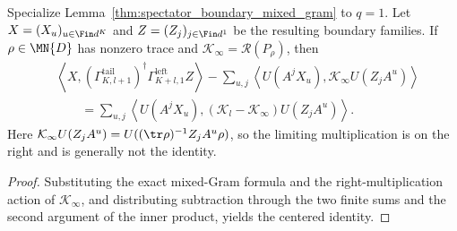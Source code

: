 \begin{lemma}%
    \label{thm:spectator_boundary_mixed_gram_centered}
    \leanok
    Specialize Lemma~\ref{thm:spectator_boundary_mixed_gram} to $q=1$.  Let
    $X=(X_u)_{u\in\Fin d^K}$ and
    $Z=(Z_j)_{j\in\Fin d^1}$ be the resulting boundary families.  If
    $\rho\in\MN{D}$ has nonzero trace and
    $\mathcal K_\infty=\mathscr R(P_\rho)$, then
    \begin{align}
         & \left\langle X,
        (\Gamma^{\mathrm{tail}}_{K,l+1})^\dagger
        \Gamma^{\mathrm{left}}_{K+l,1}Z\right\rangle
        -\sum_{u,j}\left\langle
        U(A^jX_u),\mathcal K_\infty U(Z_jA^u)\right\rangle \\
         & \qquad=\sum_{u,j}\left\langle
        U(A^jX_u),(\mathcal K_l-\mathcal K_\infty)U(Z_jA^u)
        \right\rangle .
    \end{align}
    Here
    $\mathcal K_\infty U(Z_jA^u)
        =U((\tr\rho)^{-1}Z_jA^u\rho)$,
    so the limiting multiplication is on the right and is generally not the
    identity.
\end{lemma}
\begin{proof}
    \leanok
    Substituting the exact mixed-Gram formula and the right-multiplication
    action of $\mathcal K_\infty$, and distributing subtraction through the two
    finite sums and the second argument of the inner product, yields the
    centered identity.
\end{proof}

